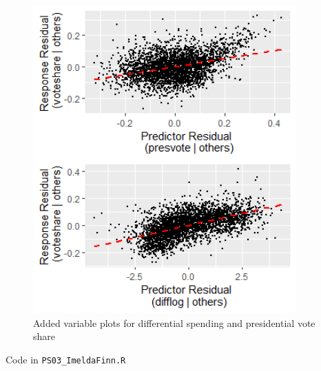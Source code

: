 \documentclass[12pt,letterpaper]{article}
\begin{document}
  
	    \begin{figure}
		    \includegraphics[width=0.9\textwidth]{Graphics/av_gg_manual.png}
		    \caption{Added variable plots for differential spending and presidential vote share}
		    \label{fig:add_var}
      \end{figure}

\clearpage


	Code in \verb|PS03_ImeldaFinn.R| 
\end{document}
